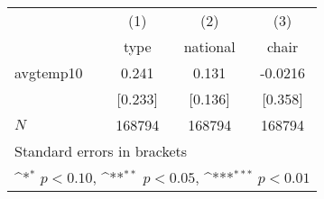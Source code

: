 {
\def\sym#1{\ifmmode^{#1}\else\(^{#1}\)\fi}
\begin{tabular}{l*{3}{c}}
\hline\hline
            &\multicolumn{1}{c}{(1)}&\multicolumn{1}{c}{(2)}&\multicolumn{1}{c}{(3)}\\
            &\multicolumn{1}{c}{type}&\multicolumn{1}{c}{national}&\multicolumn{1}{c}{chair}\\
\hline
avgtemp10   &       0.241         &       0.131         &     -0.0216         \\
            &     [0.233]         &     [0.136]         &     [0.358]         \\
\hline
\(N\)       &      168794         &      168794         &      168794         \\
\hline\hline
\multicolumn{4}{l}{\footnotesize Standard errors in brackets}\\
\multicolumn{4}{l}{\footnotesize \sym{*} \(p<0.10\), \sym{**} \(p<0.05\), \sym{***} \(p<0.01\)}\\
\end{tabular}
}
